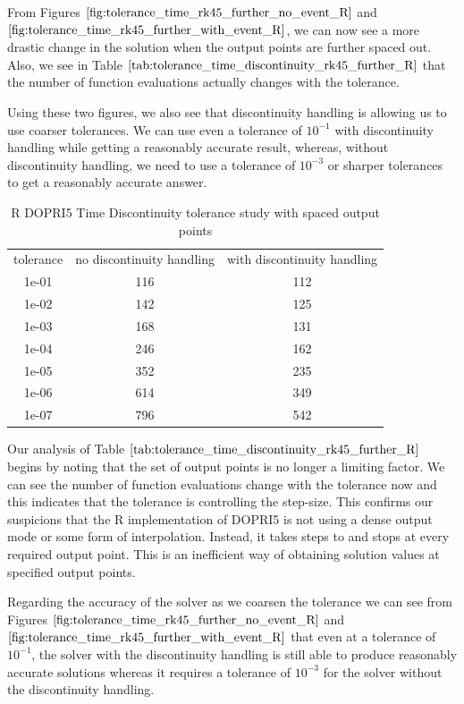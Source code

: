 From Figures $\ref{fig:tolerance_time_rk45_further_no_event_R}$ and $\ref{fig:tolerance_time_rk45_further_with_event_R}$, we can now see a more drastic change in the solution when the output points are further spaced out. Also, we see in Table $\ref{tab:tolerance_time_discontinuity_rk45_further_R}$ that the number of function evaluations actually changes with the tolerance.

Using these two figures, we also see that discontinuity handling is allowing us to use coarser tolerances. We can use even a tolerance of $10^{-1}$ with discontinuity handling while getting a reasonably accurate result, whereas, without discontinuity handling, we need to use a tolerance of $10^{-3}$ or sharper tolerances to get a reasonably accurate answer.

\begin{table}[H]
\caption {R DOPRI5 Time Discontinuity tolerance study with spaced output points} \label{tab:tolerance_time_discontinuity_rk45_further_R} 
\begin{center}
\begin{tabular}{ c c c }
tolerance & no discontinuity handling & with discontinuity handling \\ 
1e-01 & 116 & 112 \\
1e-02 & 142 & 125 \\
1e-03 & 168 & 131 \\
1e-04 & 246 & 162 \\
1e-05 & 352 & 235 \\
1e-06 & 614 & 349 \\
1e-07 & 796 & 542 \\
\end{tabular}
\end{center}
\end{table}

Our analysis of Table $\ref{tab:tolerance_time_discontinuity_rk45_further_R}$ begins by noting that the set of output points is no longer a limiting factor. We can see the number of function evaluations change with the tolerance now and this indicates that the tolerance is controlling the step-size. This confirms our suspicions that the R implementation of DOPRI5 is not using a dense output mode or some form of interpolation. Instead, it takes steps to and stops at every required output point. This is an inefficient way of obtaining solution values at specified output points. 

Regarding the accuracy of the solver as we coarsen the tolerance we can see from Figures $\ref{fig:tolerance_time_rk45_further_no_event_R}$ and $\ref{fig:tolerance_time_rk45_further_with_event_R}$ that even at a tolerance of $10^{-1}$, the solver with the discontinuity handling is still able to produce reasonably accurate solutions whereas it requires a tolerance of $10^{-3}$ for the solver without the discontinuity handling.

